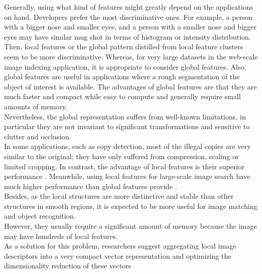Generally, using what kind of features might greatly depend on the applications
on hand. Developers prefer the most discriminative ones. For example, a person with
a bigger nose and smaller eyes, and a person with a smaller nose and bigger eyes
may have similar mug shot in terms of histogram or intensity distribution. Then, local
features or the global pattern distilled from local feature clusters seem to be more
discriminative. Whereas, for very large datasets in the web-scale image indexing
application, it is appropriate to consider global features. Also, global features are
useful in applications where a rough segmentation of the object of interest is available.
The advantages of global features are that they are much faster and compact
while easy to compute and generally require small amounts of memory.\\ Nevertheless,
the global representation suffers from well-known limitations, in particular they
are not invariant to significant transformations and sensitive to clutter and occlusion.\\In some applications, such as copy detection, most of the illegal copies are very
similar to the original; they have only suffered from compression, scaling or limited
cropping. In contrast, the advantage of local features is their superior performance
\cite{i}. Meanwhile, using local features for large-scale image search have much higher
performance than global features provide \cite{k}.\\ Besides, as the local structures are
more distinctive and stable than other structures in smooth regions, it is expected
to be more useful for image matching and object recognition.\\ However, they usually
require a significant amount of memory because the image may have hundreds
of local features.\\ As a solution for this problem, researchers suggest aggregating
local image descriptors into a very compact vector representation and optimizing the
dimensionality reduction of these vectors \cite{k}

